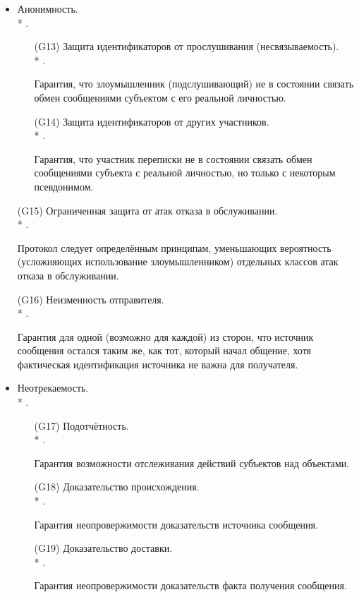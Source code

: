 \begin{itemize}
	\item Анонимность.\\*
		.
	\begin{itemize}
		\item[(G13)] Защита идентификаторов от прослушивания (несвязываемость).\\*
			.
		\item[{}] Гарантия, что злоумышленник (подслушивающий) не в состоянии связать обмен сообщениями субъектом с его реальной личностью.
		\item[(G14)] Защита идентификаторов от других участников.\\*
			.
		\item[{}] Гарантия, что участник переписки не в состоянии связать обмен сообщениями субъекта с реальной личностью, но только с некоторым псевдонимом.
	\end{itemize}

	\item[(G15)] Ограниченная защита от атак отказа в обслуживании.\\*
		.
	\item[{}] Протокол следует определённым принципам, уменьшающих вероятность (усложняющих использование злоумышленником) отдельных классов атак отказа в обслуживании.

	\item[(G16)] Неизменность отправителя.\\*
		.
	\item[{}] Гарантия для одной (возможно для каждой) из сторон, что источник сообщения остался таким же, как тот, который начал общение, хотя фактическая идентификация источника не важна для получателя.

	\item Неотрекаемость.\\*
		.
	\begin{itemize}
		\item[(G17)] Подотчётность.\\*
			.
		\item[{}] Гарантия возможности отслеживания действий субъектов над объектами.
		\item[(G18)] Доказательство происхождения.\\*
			.
		\item[{}] Гарантия неопровержимости доказательств источника сообщения.
		\item[(G19)] Доказательство доставки.\\*
			.
		\item[{}] Гарантия неопровержимости доказательств факта получения сообщения.
	\end{itemize}


\end{itemize}
